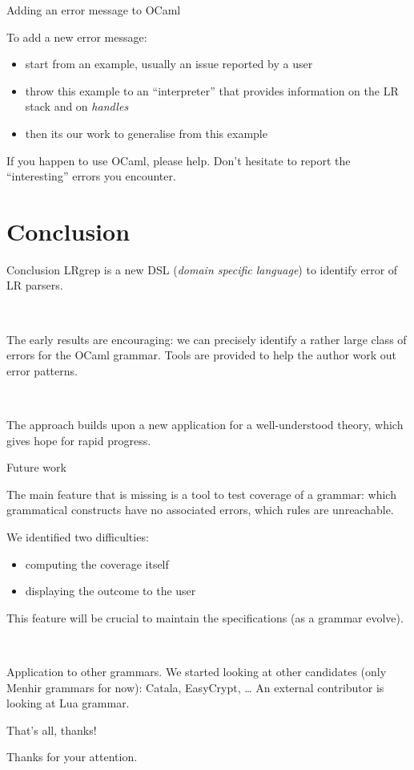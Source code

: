 \documentclass[aspectratio=169]{beamer}          %
\begin{document}
\begin{frame}{Adding an error message to OCaml}

  To add a new error message:
  \begin{itemize}
    \item start from an example, usually an issue reported by a user
    \item throw this example to an ``interpreter'' that provides information on the LR stack and on {\em handles}
    \item then its our work to generalise from this example
  \end{itemize}
  \pause
  \begin{block}{If you happen to use OCaml, please help.}
    Don't hesitate to report the ``interesting'' errors you encounter.
  \end{block}
\end{frame}

\section{Conclusion}

\begin{frame}{Conclusion}
  LRgrep is a new DSL ({\em domain specific language}) to identify error of LR parsers.

\

  The early results are encouraging: we can precisely identify a rather large class of errors for the OCaml grammar. Tools are provided to help the author work out error patterns.

\

  The approach builds upon a new application for a well-understood theory, which gives hope for rapid progress.

\end{frame}

\begin{frame}{Future work}

  The main feature that is missing is a tool to test coverage of a grammar:
  which grammatical constructs have no associated errors, which rules are unreachable.

  We identified two difficulties:
\begin{itemize}
  \item computing the coverage itself
  \item displaying the outcome to the user
\end{itemize}

This feature will be crucial to maintain the specifications (as a grammar evolve).

\

\pause
Application to other grammars. We started looking at other candidates (only Menhir grammars for now): Catala, EasyCrypt, \ldots
An external contributor is looking at Lua grammar.

\end{frame}

\begin{frame}{That's all, thanks!}

  Thanks for your attention.

\end{frame}
\end{document}
